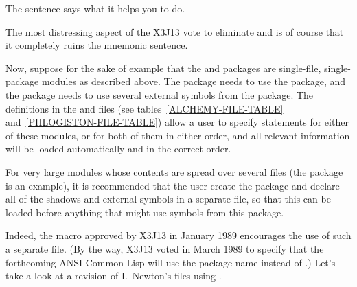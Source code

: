 The sentence says what it helps you to do.

\begin{new}
The most distressing aspect of the X3J13 vote to eliminate
 and 
is of course that it completely ruins the mnemonic sentence.
\end{new}


Now, suppose for the sake of example
that the  and  packages are
single-file, single-package modules as described above.  The 
package needs to use the  package, and the  package
needs to use several
external symbols from the  package.
The definitions in the  and  files
(see tables~\ref{ALCHEMY-FILE-TABLE} and~\ref{PHLOGISTON-FILE-TABLE})
allow a
user to specify  statements for either of these modules, or for
both of them in either order, and all relevant information will be
loaded automatically and in the correct order.

\begin{obsolete}
For very large modules whose contents are spread over several files
(the  package is an example), it is recommended that the user
create the package and declare all of the shadows and external symbols
in a separate file, so that this can be loaded before anything that
might use symbols from this package.
\end{obsolete}

\begin{new}
Indeed, the  macro
approved by X3J13 in January 1989
encourages the use of such a separate file.
(By the way,
X3J13 voted in March 1989  to specify that
the forthcoming ANSI Common Lisp will use the package name 
instead of .)
Let's take a look at a revision
of I.~Newton's files using .
\end{new}

